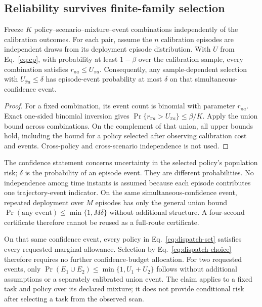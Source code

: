 \subsection{Reliability survives finite-family selection}
\begin{theorem}\label{thm:calibration}
Freeze $K$ policy--scenario--mixture--event combinations independently of the calibration outcomes. For each pair, assume the $n$ calibration episodes are independent draws from its deployment episode distribution. With $U$ from Eq.~\eqref{eq:cp}, with probability at least $1-\beta$ over the calibration sample, every combination satisfies $r_{\pi a}\le U_{\pi a}$. Consequently, any sample-dependent selection with $U_{\widehat\pi a}\le\delta$ has episode-event probability at most $\delta$ on that simultaneous-confidence event.
\end{theorem}
\begin{proof}
For a fixed combination, its event count is binomial with parameter $r_{\pi a}$. Exact one-sided binomial inversion gives $\Pr\{r_{\pi a}>U_{\pi a}\}\le\beta/K$. Apply the union bound across combinations. On the complement of that union, all upper bounds hold, including the bound for a policy selected after observing calibration cost and events. Cross-policy and cross-scenario independence is not used.
\end{proof}
The confidence statement concerns uncertainty in the selected policy's population risk; $\delta$ is the probability of an episode event. They are different probabilities. No independence among time instants is assumed because each episode contributes one trajectory-event indicator. On the same simultaneous-confidence event, repeated deployment over $M$ episodes has only the general union bound $\Pr(\text{any event})\le\min\{1,M\delta\}$ without additional structure. A four-second certificate therefore cannot be reused as a full-route certificate.

On that same confidence event, every policy in Eq.~\eqref{eq:dispatch-set} satisfies every requested marginal allowance. Selection by Eq.~\eqref{eq:dispatch-choice} therefore requires no further confidence-budget allocation. For two requested events, only $\Pr(E_1\cup E_2)\le\min\{1,U_1+U_2\}$ follows without additional assumptions or a separately calibrated union event. The claim applies to a fixed task and policy over its declared mixture; it does not provide conditional risk after selecting a task from the observed scan.

